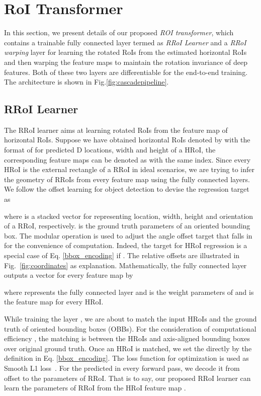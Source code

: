 \documentclass[11pt,onecolumn]{article}         \usepackage[top=3.6cm, bottom=3.2cm, left=2.3cm, right=2.3cm]{geometry}
\begin{document}
\section{RoI Transformer}
In this section, we present details of our proposed \emph{ROI transformer}, which contains a trainable fully connected layer termed as \emph{RRoI Learner} and a \emph{RRoI warping} layer for learning the rotated RoIs from the estimated horizontal RoIs and then warping the feature maps to maintain the rotation invariance of deep features. Both of these two layers are differentiable for the end-to-end training.
The architecture is shown in Fig.\ref{fig:cascadepipeline}.
\subsection{RRoI Learner}
The RRoI learner aims at learning rotated RoIs from the feature map of horizontal RoIs. 
Suppose we have obtained  horizontal RoIs denoted by  with the format of  for predicted D locations, width and height of a HRoI, the corresponding feature maps can be denoted as  with the same index.
Since every HRoI is the external rectangle of a RRoI in ideal scenarios, we are trying to infer the geometry of RRoIs from every feature map  using the fully connected layers. We follow the offset learning for object detection to devise the regression target as 

where  is a stacked vector for representing location, width, height and orientation of a RRoI, respectively.  is the ground truth parameters of an oriented bounding box. The modular operation is used to adjust the angle offset target  that falls in  for the convenience of computation. Indeed, the target for HRoI regression is a special case of Eq. \eqref{bbox_encoding} if . The relative offsets are illustrated  in Fig.~\ref{fig:coordinates} as explanation. Mathematically, the fully connected layer outputs a vector   for every feature map  by 

where  represents the fully connected layer and  is the weight parameters of  and  is the feature map for every HRoI.

While training the layer , we are about to match the input HRoIs and the ground truth of oriented bounding boxes (OBBs). 
{For the consideration of computational efficiency , the matching is between the HRoIs and axis-aligned bounding boxes over original ground truth.} 
Once an HRoI is matched, we set the  directly by the definition in Eq. \eqref{bbox_encoding}. The loss function for optimization is used as Smooth L1 loss~\cite{r-cnn}. 
For the predicted  in every forward pass, we decode it from offset to the parameters of RRoI. That is to say, our proposed RRoI learner can learn the parameters of RRoI from the HRoI feature map  .
\end{document}
